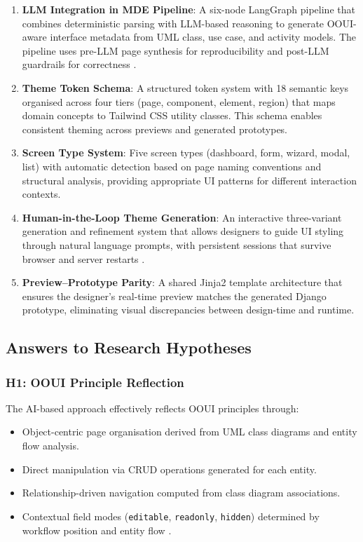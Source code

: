 \begin{enumerate}
    \item \textbf{LLM Integration in MDE Pipeline}: A six-node LangGraph pipeline that combines deterministic parsing with LLM-based reasoning to generate OOUI-aware interface metadata from UML class, use case, and activity models. The pipeline uses pre-LLM page synthesis for reproducibility and post-LLM guardrails for correctness \cite{dH24, vD24}.
    
    \item \textbf{Theme Token Schema}: A structured token system with 18 semantic keys organised across four tiers (page, component, element, region) that maps domain concepts to Tailwind CSS utility classes. This schema enables consistent theming across previews and generated prototypes.
    
    \item \textbf{Screen Type System}: Five screen types (dashboard, form, wizard, modal, list) with automatic detection based on page naming conventions and structural analysis, providing appropriate UI patterns for different interaction contexts.
    
    \item \textbf{Human-in-the-Loop Theme Generation}: An interactive three-variant generation and refinement system that allows designers to guide UI styling through natural language prompts, with persistent sessions that survive browser and server restarts \cite{Ver25}.
    
    \item \textbf{Preview--Prototype Parity}: A shared Jinja2 template architecture that ensures the designer's real-time preview matches the generated Django prototype, eliminating visual discrepancies between design-time and runtime.
\end{enumerate}


\subsection{Answers to Research Hypotheses}

\subsubsection{H1: OOUI Principle Reflection}

The AI-based approach effectively reflects OOUI principles through:
\begin{itemize}
    \item Object-centric page organisation derived from UML class diagrams and entity flow analysis.
    \item Direct manipulation via CRUD operations generated for each entity.
    \item Relationship-driven navigation computed from class diagram associations.
    \item Contextual field modes (\texttt{editable}, \texttt{readonly}, \texttt{hidden}) determined by workflow position and entity flow \cite{Ver25}.
\end{itemize}


